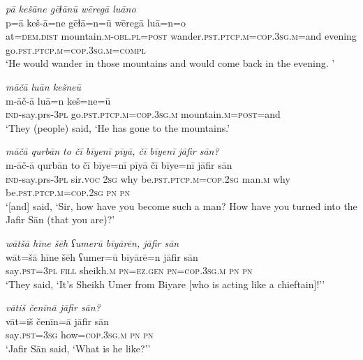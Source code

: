 \ea \label{ŠJ.8}
\textit{pā kešāne gēɫānū wēregā luāno} \\ 
\gll p=ā keš-ā=ne gēɫā=n=ū wēregā luā=n=o \\ 
 at=\textsc{dem.dist} mountain\textsc{.m}\textsc{-obl}\textsc{.pl}\textsc{=\textsc{post}} wander\textsc{.pst}\textsc{.ptcp}\textsc{.m}\textsc{=cop}\textsc{.3sg}\textsc{.m}=and evening go\textsc{.pst}\textsc{.ptcp}\textsc{.m}\textsc{=cop}\textsc{.3sg}\textsc{.m}\textsc{=compl} \\ 
\glt `He would wander in those mountains and would come back in the evening. '
\z 
 
\ea \label{ŠJ.11}
\textit{māčā luān kešneū} \\ 
\gll m-āč-ā luā=n keš=ne=ū \\ 
 \textsc{ind-}say.prs\textsc{-3pl} go\textsc{.pst}\textsc{.ptcp}\textsc{.m}\textsc{=cop}\textsc{.3sg}\textsc{.m} mountain\textsc{.m}\textsc{=\textsc{post}}=and \\ 
\glt `They (people) said, ‘He has gone to the mountains.'
\z 
 
\ea \label{ŠJ.14}
\textit{māčā qurbān to čī bīyenī pīyā, čī bīyenī jāfir sān?} \\ 
\gll m-āč-ā qurbān to čī bīye=nī pīyā čī bīye=nī jāfir sān \\ 
 \textsc{ind-}say.prs\textsc{-3pl} sir.\textsc{voc} \textsc{2sg} why be\textsc{.pst}\textsc{.ptcp}\textsc{.m}\textsc{=cop}\textsc{.\textsc{2sg}} man\textsc{.m} why be\textsc{.pst}\textsc{.ptcp}\textsc{.m}\textsc{=cop}\textsc{.\textsc{2sg}} \textsc{pn} \textsc{pn} \\ 
\glt `[and] said, ‘Sir, how have you become such a man? How have you turned into the Jafir Sān (that you are)?'
\z 
 
\ea \label{ŠJ.15}
\textit{wātšā hīne šēh ʕumerū bīyārēn, jāfir sān} \\ 
\gll wāt=šā hīne šēh ʕumer=ū bīyārē=n jāfir sān \\ 
 say\textsc{.pst}\textsc{=3pl} \textsc{fill} sheikh\textsc{.m} \textsc{pn}\textsc{=ez.gen} \textsc{pn}\textsc{=cop}\textsc{.3sg}\textsc{.m} \textsc{pn} \textsc{pn} \\ 
\glt `They said, ‘It’s Sheikh Umer from Biyare [who is acting like a chieftain]!’'
\z 
 
\ea \label{ŠJ.16}
\textit{vātiš čenīnā jāfir sān?} \\ 
\gll vāt=iš čenīn=ā jāfir sān \\ 
 say\textsc{.pst}\textsc{=3sg} how\textsc{=cop}\textsc{.3sg}\textsc{.m} \textsc{pn} \textsc{pn} \\ 
\glt `Jafir Sān said, ‘What is he like?’'
\z 
 
